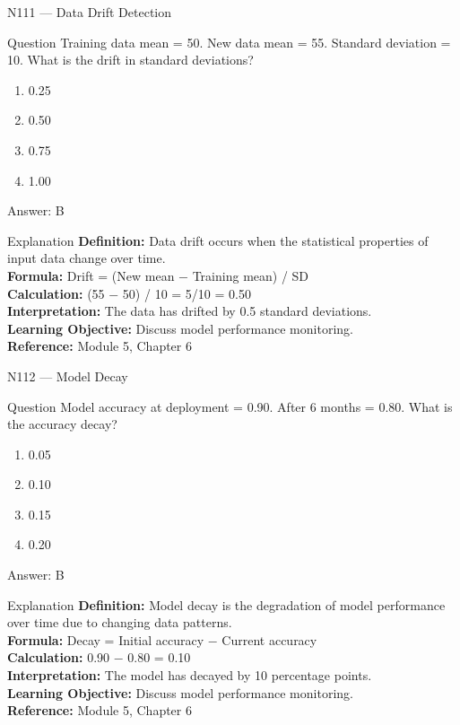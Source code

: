 \documentclass[aspectratio=169,8pt]{beamer}
\begin{document}
	\begin{frame}{N111 --- Data Drift Detection}
		\begin{block}{Question}
			Training data mean = 50. New data mean = 55. Standard deviation = 10. What is the drift in standard deviations?
			\begin{enumerate}
				\item 0.25
				\item 0.50
				\item 0.75
				\item 1.00
			\end{enumerate}
		\end{block}
		\begin{exampleblock}{Answer: B}\end{exampleblock}
		\begin{block}{Explanation}
			\textbf{Definition:} Data drift occurs when the statistical properties of input data change over time.\\
			\textbf{Formula:} Drift = (New mean $-$ Training mean) / SD\\
			\textbf{Calculation:} (55 $-$ 50) / 10 = 5/10 = 0.50\\
			\textbf{Interpretation:} The data has drifted by 0.5 standard deviations.\\
			\textbf{Learning Objective:} Discuss model performance monitoring.\\
			\textbf{Reference:} Module 5, Chapter 6
		\end{block}
	\end{frame}
	
	\begin{frame}{N112 --- Model Decay}
		\begin{block}{Question}
			Model accuracy at deployment = 0.90. After 6 months = 0.80. What is the accuracy decay?
			\begin{enumerate}
				\item 0.05
				\item 0.10
				\item 0.15
				\item 0.20
			\end{enumerate}
		\end{block}
		\begin{exampleblock}{Answer: B}\end{exampleblock}
		\begin{block}{Explanation}
			\textbf{Definition:} Model decay is the degradation of model performance over time due to changing data patterns.\\
			\textbf{Formula:} Decay = Initial accuracy $-$ Current accuracy\\
			\textbf{Calculation:} 0.90 $-$ 0.80 = 0.10\\
			\textbf{Interpretation:} The model has decayed by 10 percentage points.\\
			\textbf{Learning Objective:} Discuss model performance monitoring.\\
			\textbf{Reference:} Module 5, Chapter 6
		\end{block}
	\end{frame}
	
\end{document}
